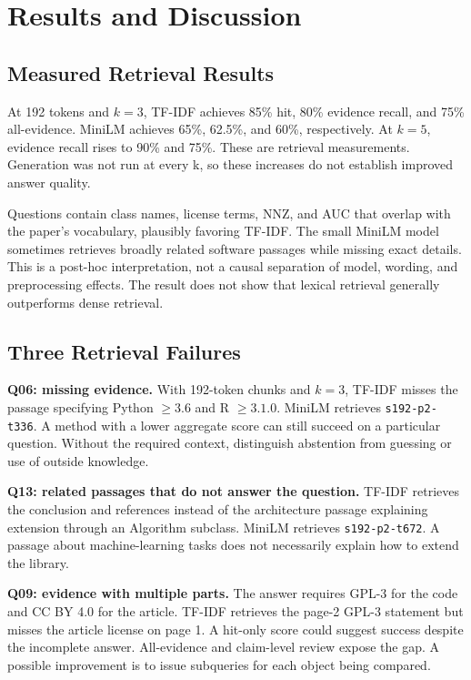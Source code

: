 \documentclass[12pt,a4paper]{article}
\begin{document}
\section{Results and Discussion}
\subsection*{Measured Retrieval Results}

At 192 tokens and $k=3$, TF-IDF achieves 85\% hit, 80\% evidence recall, and 75\% all-evidence. MiniLM achieves 65\%, 62.5\%, and 60\%, respectively. At $k=5$, evidence recall rises to 90\% and 75\%. These are retrieval measurements. Generation was not run at every k, so these increases do not establish improved answer quality.

Questions contain class names, license terms, NNZ, and AUC that overlap with the paper's vocabulary, plausibly favoring TF-IDF. The small MiniLM model sometimes retrieves broadly related software passages while missing exact details. This is a post-hoc interpretation, not a causal separation of model, wording, and preprocessing effects. The result does not show that lexical retrieval generally outperforms dense retrieval.

\subsection*{Three Retrieval Failures}
\textbf{Q06: missing evidence.} With 192-token chunks and $k=3$, TF-IDF misses the passage specifying Python $\ge3.6$ and R $\ge3.1.0$. MiniLM retrieves \texttt{s192-p2-t336}. A method with a lower aggregate score can still succeed on a particular question. Without the required context, distinguish abstention from guessing or use of outside knowledge.

\textbf{Q13: related passages that do not answer the question.} TF-IDF retrieves the conclusion and references instead of the architecture passage explaining extension through an Algorithm subclass. MiniLM retrieves \texttt{s192-p2-t672}. A passage about machine-learning tasks does not necessarily explain how to extend the library.

\textbf{Q09: evidence with multiple parts.} The answer requires GPL-3 for the code and CC BY 4.0 for the article. TF-IDF retrieves the page-2 GPL-3 statement but misses the article license on page 1. A hit-only score could suggest success despite the incomplete answer. All-evidence and claim-level review expose the gap. A possible improvement is to issue subqueries for each object being compared.
\end{document}
